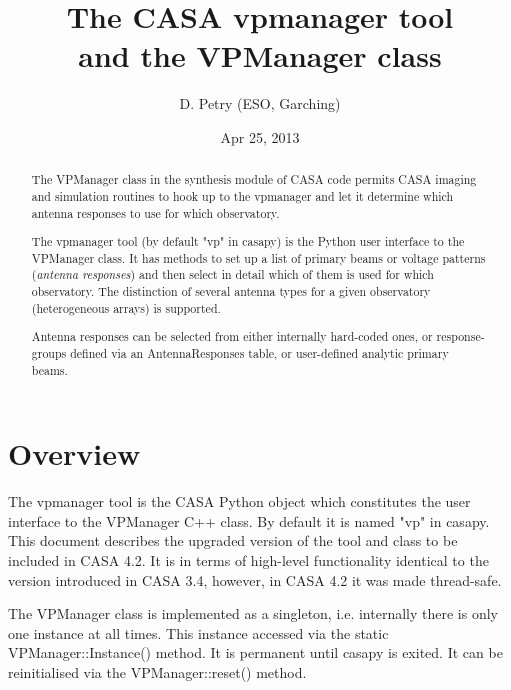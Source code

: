 \documentclass[12pt]{article}
\begin{document}
\title{The CASA vpmanager tool\\ and the VPManager class}
\author{D. Petry (ESO, Garching)}
\date{Apr 25, 2013\\%
}
\maketitle
\normalsize
{}

\begin{abstract}
\noindent
The VPManager class in the synthesis module of CASA code permits 
CASA imaging and simulation routines to hook up to the vpmanager and let it determine
which antenna responses to use for which observatory.

The vpmanager tool (by default "vp" in casapy) is the Python user interface to the VPManager
class. It has methods to set up a list of primary beams or voltage patterns
({\it antenna responses}) and then select in detail 
which of them is used for which observatory.
The distinction of several antenna types for a given observatory (heterogeneous
arrays) is supported.
 
Antenna responses can be selected from either internally 
hard-coded ones, or response-groups defined via an AntennaResponses table, or
user-defined analytic primary beams.
\end{abstract}

\section{Overview}

The vpmanager tool is the CASA Python object which constitutes the
user interface to the VPManager C++ class. By default it is named "vp" in casapy.
This document describes
the upgraded version of the tool and class to be included in CASA 4.2.
It is in terms of high-level functionality identical to the version introduced in CASA 3.4,
however, in CASA 4.2 it was made thread-safe.

The VPManager class is implemented as a singleton, i.e. internally there is only one instance
at all times. This instance accessed via the static VPManager::Instance() method. It is permanent 
until casapy is exited. It can be reinitialised via the VPManager::reset() method.
\end{document}
